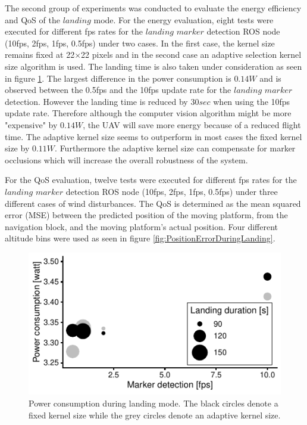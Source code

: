 \documentclass[conference]{IEEEtran}
\begin{document}
The second group of experiments was conducted to evaluate the 
energy efficiency and QoS of the $landing$ mode. 
For the energy evaluation, eight tests were executed for different 
fps rates for the $landing$ $marker$ detection ROS node 
(10fps, 2fps, 1fps, 0.5fps) under two cases. 
In the first case, the kernel size remains fixed at 
22$\times$22 pixels and in the second case an adaptive selection 
kernel size algorithm is used. 
The landing time is also taken under consideration as seen in figure \ref{fig:PowerDuringLanding}. The largest difference in the power consumption is $0.14 W$ and is observed between the 0.5fps and the 10fps update rate for the $landing$ $marker$ detection. However the landing time is reduced by $30 sec$ when using the 10fps update rate. Therefore although the computer vision algorithm might be more "expensive" by $0.14W$, the UAV will save more energy because of a reduced flight time. The adaptive kernel size seems to outperform in most cases the fixed kernel size by $0.11 W$. Furthermore the adaptive kernel size can compensate for marker occlusions which will increase the overall robustness of the system.

For the QoS evaluation, twelve tests were executed for different 
fps rates for the $landing$ $marker$ detection ROS node 
(10fps, 2fps, 1fps, 0.5fps) under three different cases of wind
disturbances. The QoS is determined as the  mean squared error (MSE) 
between the predicted position of the moving platform, 
from the navigation block, and the moving platform's actual position. 
Four different altitude bins were used as seen in figure 
\ref{fig:PositionErrorDuringLanding}.

\begin{figure}[h]
\centering
\includegraphics{data_visualization/PowerLanding.pdf}
\caption{Power consumption during landing mode. 
The black circles denote a fixed kernel size while the grey circles denote an adaptive kernel size.}
\label{fig:PowerDuringLanding}
\end{figure}
\end{document}
